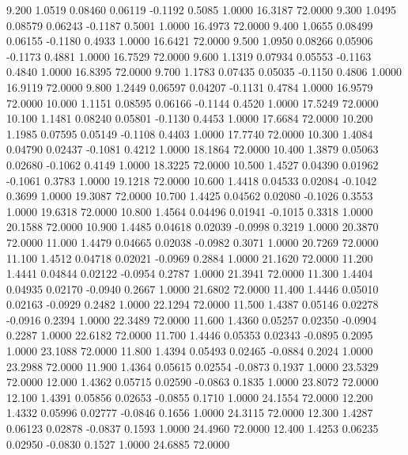    9.200   1.0519   0.08460   0.06119  -0.1192   0.5085   1.0000  16.3187  72.0000
   9.300   1.0495   0.08579   0.06243  -0.1187   0.5001   1.0000  16.4973  72.0000
   9.400   1.0655   0.08499   0.06155  -0.1180   0.4933   1.0000  16.6421  72.0000
   9.500   1.0950   0.08266   0.05906  -0.1173   0.4881   1.0000  16.7529  72.0000
   9.600   1.1319   0.07934   0.05553  -0.1163   0.4840   1.0000  16.8395  72.0000
   9.700   1.1783   0.07435   0.05035  -0.1150   0.4806   1.0000  16.9119  72.0000
   9.800   1.2449   0.06597   0.04207  -0.1131   0.4784   1.0000  16.9579  72.0000
  10.000   1.1151   0.08595   0.06166  -0.1144   0.4520   1.0000  17.5249  72.0000
  10.100   1.1481   0.08240   0.05801  -0.1130   0.4453   1.0000  17.6684  72.0000
  10.200   1.1985   0.07595   0.05149  -0.1108   0.4403   1.0000  17.7740  72.0000
  10.300   1.4084   0.04790   0.02437  -0.1081   0.4212   1.0000  18.1864  72.0000
  10.400   1.3879   0.05063   0.02680  -0.1062   0.4149   1.0000  18.3225  72.0000
  10.500   1.4527   0.04390   0.01962  -0.1061   0.3783   1.0000  19.1218  72.0000
  10.600   1.4418   0.04533   0.02084  -0.1042   0.3699   1.0000  19.3087  72.0000
  10.700   1.4425   0.04562   0.02080  -0.1026   0.3553   1.0000  19.6318  72.0000
  10.800   1.4564   0.04496   0.01941  -0.1015   0.3318   1.0000  20.1588  72.0000
  10.900   1.4485   0.04618   0.02039  -0.0998   0.3219   1.0000  20.3870  72.0000
  11.000   1.4479   0.04665   0.02038  -0.0982   0.3071   1.0000  20.7269  72.0000
  11.100   1.4512   0.04718   0.02021  -0.0969   0.2884   1.0000  21.1620  72.0000
  11.200   1.4441   0.04844   0.02122  -0.0954   0.2787   1.0000  21.3941  72.0000
  11.300   1.4404   0.04935   0.02170  -0.0940   0.2667   1.0000  21.6802  72.0000
  11.400   1.4446   0.05010   0.02163  -0.0929   0.2482   1.0000  22.1294  72.0000
  11.500   1.4387   0.05146   0.02278  -0.0916   0.2394   1.0000  22.3489  72.0000
  11.600   1.4360   0.05257   0.02350  -0.0904   0.2287   1.0000  22.6182  72.0000
  11.700   1.4446   0.05353   0.02343  -0.0895   0.2095   1.0000  23.1088  72.0000
  11.800   1.4394   0.05493   0.02465  -0.0884   0.2024   1.0000  23.2988  72.0000
  11.900   1.4364   0.05615   0.02554  -0.0873   0.1937   1.0000  23.5329  72.0000
  12.000   1.4362   0.05715   0.02590  -0.0863   0.1835   1.0000  23.8072  72.0000
  12.100   1.4391   0.05856   0.02653  -0.0855   0.1710   1.0000  24.1554  72.0000
  12.200   1.4332   0.05996   0.02777  -0.0846   0.1656   1.0000  24.3115  72.0000
  12.300   1.4287   0.06123   0.02878  -0.0837   0.1593   1.0000  24.4960  72.0000
  12.400   1.4253   0.06235   0.02950  -0.0830   0.1527   1.0000  24.6885  72.0000
